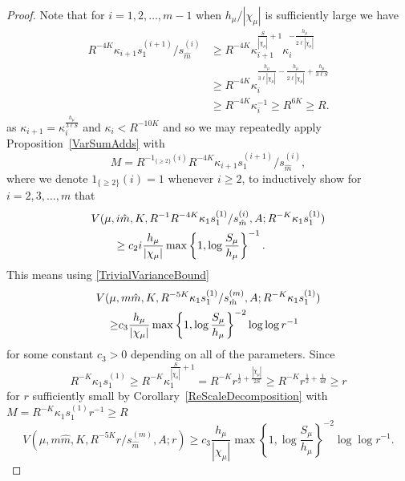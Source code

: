 \documentclass[10pt, english,oneside,reqno]{amsart}
\theoremstyle{plain}
\theoremstyle{remark}
\numberwithin{equation}{section}
\numberwithin{figure}{section}
\begin{document}
\begin{proof}
    Note that for $i = 1, 2, \dots, m-1$ when $h_{\mu} / |\chi_{\mu}|$ is sufficiently large we have
    \begin{align*}
        R^{-4K} \kappa_{i + 1} s_1^{(i+1)} / s_{\hat{m}}^{(i)} & \geq R^{-4K} \kappa_{i+1}^{\frac{S}{|\chi_{\mu}|} + 1} \kappa_i^{ - \frac{h_{\mu}}{2 \ell |\chi_{\mu}|}} \\ &\geq R^{-4K} \kappa_i^{\frac{h_{\mu}}{3 \ell |\chi_{\mu}|} - \frac{h_{\mu}}{2 \ell |\chi_{\mu}|} + \frac{h_{\mu}}{3\ell S}}  \\ &\geq R^{-4K}\kappa_i^{-1} \geq R^{6K} \geq R.
    \end{align*}
    as $\kappa_{i + 1} = \kappa_i^{\frac{h_{\mu}}{3 \ell S}}$ and $\kappa_i < R^{-10K}$ and so we may repeatedly apply Proposition~\ref{VarSumAdds} with $$M=R^{-1_{\{ \geq 2 \}}(i)}R^{-4K} \kappa_{i+1} s_1^{(i+1)}/s_{\hat{m}}^{(i)},$$ where we denote $1_{\{ \geq 2 \}}(i) = 1$ whenever $i \geq 2$, to inductively show for $i = 2, 3, \dots, m$ that
    \begin{align*}
       \MoveEqLeft V(\mu,i\hat{m},K,R^{-1}R^{-4K} \kappa_1 s_1^{(1)} / s_{\hat{m}}^{(i)} , A; R^{-K} \kappa_1 s_{1}^{(1)}) \\ &\geq c_2 i \frac{h_{\mu}}{|\chi_{\mu}|} \max \left\{1, \log \frac{S_{\mu}}{h_{\mu}} \right\}^{-1}.
    \end{align*}
    This means using \eqref{TrivialVarianceBound}
    \begin{align*}
        \MoveEqLeft V(\mu,m\hat{m},K,R^{-5K} \kappa_1 s_1^{(1)} / s_{\hat{m}}^{(m)} , A; R^{-K} \kappa_1 s_{1}^{(1)}) \\\geq & c_3  \frac{h_{\mu}}{|\chi_{\mu}|} \max \left\{1, \log \frac{S_{\mu}}{h_{\mu}} \right\}^{-2} \log \log r^{-1}
    \end{align*}
    for some constant $c_3 > 0$ depending on all of the parameters. Since $$R^{-K} \kappa_1 s_{1}^{(1)} \geq  R^{-K} \kappa_1^{\frac{S}{|\chi_{\mu}|} + 1} = R^{-K}  r^{\frac{1}{2} + \frac{|\chi_{\mu}|}{2S}} \geq R^{-K} r^{\frac{1}{2} + \frac{1}{4d}} \geq r$$ for $r$ sufficiently small by Corollary~\ref{ReScaleDecomposition} with $M = R^{-K} \kappa_1 s_{1}^{(1)} r^{-1} \geq R$
    \begin{equation*}
        V(\mu,m\hat{m},K,R^{-5K} r / s_{\hat{m}}^{(m)} , A; r) \geq c_3  \frac{h_{\mu}}{|\chi_{\mu}|} \max \left\{1, \log \frac{S_{\mu}}{h_{\mu}} \right\}^{-2} \log \log r^{-1}.
    \end{equation*}
    

\end{proof}
\end{document}
